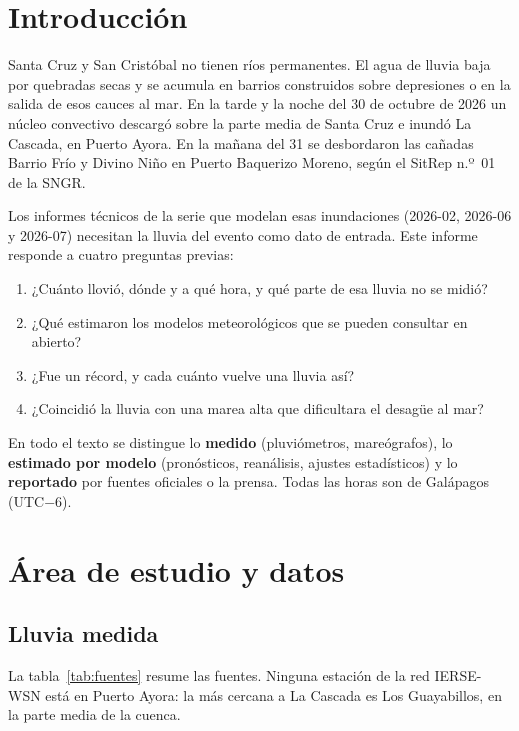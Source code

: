 \documentclass{sosg-informe}
\begin{document}
\section{Introducción}

Santa Cruz y San Cristóbal no tienen ríos permanentes. El agua de lluvia baja por quebradas secas y se acumula en barrios construidos sobre depresiones o en la salida de esos cauces al mar. En la tarde y la noche del 30 de octubre de 2026 un núcleo convectivo descargó sobre la parte media de Santa Cruz e inundó La Cascada, en Puerto Ayora. En la mañana del 31 se desbordaron las cañadas Barrio Frío y Divino Niño en Puerto Baquerizo Moreno, según el SitRep n.º~01 de la SNGR.

Los informes técnicos de la serie que modelan esas inundaciones (2026-02, 2026-06 y 2026-07) necesitan la lluvia del evento como dato de entrada. Este informe responde a cuatro preguntas previas:
\begin{enumerate}
  \item ¿Cuánto llovió, dónde y a qué hora, y qué parte de esa lluvia no se midió?
  \item ¿Qué estimaron los modelos meteorológicos que se pueden consultar en abierto?
  \item ¿Fue un récord, y cada cuánto vuelve una lluvia así?
  \item ¿Coincidió la lluvia con una marea alta que dificultara el desagüe al mar?
\end{enumerate}

En todo el texto se distingue lo \textbf{medido} (pluviómetros, mareógrafos), lo \textbf{estimado por modelo} (pronósticos, reanálisis, ajustes estadísticos) y lo \textbf{reportado} por fuentes oficiales o la prensa. Todas las horas son de Galápagos (UTC$-6$).

\section{Área de estudio y datos}

\subsection{Lluvia medida}
La tabla~\ref{tab:fuentes} resume las fuentes. Ninguna estación de la red IERSE-WSN está en Puerto Ayora: la más cercana a La Cascada es Los Guayabillos, en la parte media de la cuenca.
\end{document}
